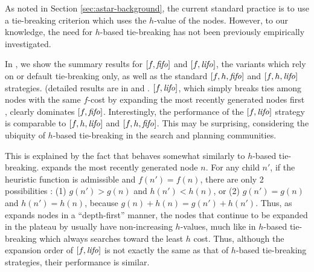 \label{sec:noh}
As noted in Section \ref{sec:astar-background}, the current standard practice is to use a tie-breaking criterion which uses the $h$-value of the nodes. However, to our knowledge, the need for $h$-based tie-breaking has not been previously empirically investigated.

In , we show the summary results for $[f, {\text{\textit{fifo}}}]$ and $[f, {\text{\textit{lifo}}}]$, the
\astar variants which rely on \fifo or \lifo default tie-breaking only, as well as the standard $[f, h, {\text{\textit{fifo}}}]$ and $[f, h, {\text{\textit{lifo}}}]$ strategies.
(detailed results are in
 and .
$[f,{\text{\textit{lifo}}}]$, which simply breaks ties among nodes with the same
$f$-cost by expanding the most recently generated nodes first
\cite{korf1985depth}, clearly dominates $[f,{\text{\textit{fifo}}}]$.  Interestingly,
the performance of the $[f,{\text{\textit{lifo}}}]$ strategy is comparable to
$[f,h,{\text{\textit{lifo}}}]$ and $[f,h,{\text{\textit{fifo}}}]$.  This may be surprising, considering
the ubiquity of $h$-based tie-breaking in the search and planning
communities.

This is explained by the fact that 
\lifo behaves somewhat similarly to $h$-based tie-breaking.
\lifo expands the most recently generated node $n$.
For any child $n'$, 
if the heuristic function is admissible and $f(n') = f(n)$, there are only 2 possibilities :
(1) $g(n') > g(n)$ and $h(n') < h(n)$, or
(2) $g(n') = g(n)$ and $h(n') = h(n)$,
because $g(n)+h(n)=g(n')+h(n')$.
Thus, as \lifo expands nodes in a ``depth-first'' manner,
the nodes that continue to be expanded in the plateau by \lifo usually   %
have non-increasing $h$-values,
much like in $h$-based tie-breaking which always searches toward the least $h$ cost.
Thus, although the expansion order of $[f,{\text{\textit{lifo}}}]$ is not exactly the same as that of $h$-based tie-breaking strategies,
their performance is similar.



